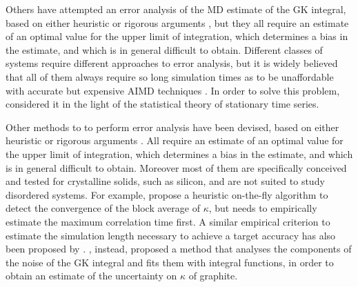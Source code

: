 \begin{LEtext}
Others have attempted an error analysis of the MD estimate of the GK integral, based on either heuristic or rigorous arguments \citep{Jones2012,Wang_gk2017,Oliveira2017}, but they all require an estimate of an optimal value for the upper limit of integration, which determines a bias in the estimate, and which is in general difficult to obtain. 
Different classes of systems require different approaches to error analysis, but it is widely believed that all of them always require so long simulation times as to be unaffordable with accurate but expensive AIMD techniques \citep{Carbogno:2017gc}. In order to solve this problem, \cite{Ercole2017} considered it in the light of the statistical theory of stationary time series.

Other methods to to perform error analysis have been devised, based on either heuristic or rigorous arguments \cite{Howell2012,Chen2010,Jones2012,Wang_gk2017,Oliveira2017}. All require an estimate of an optimal value for the upper limit of integration, which determines a bias in the estimate, and which is in general difficult to obtain. Moreover most of them are specifically conceived and tested for crystalline solids, such as silicon, and are not suited to study disordered systems. 
For example, \citet{Jones2012} propose a heuristic on-the-fly algorithm to detect the convergence of the block average of $\kappa$, but needs to empirically estimate the maximum correlation time first. A similar empirical criterion to estimate the simulation length necessary to achieve a target accuracy has also been proposed by \citet{Wang_gk2017}. \citet{Oliveira2017}, instead, proposed a method that analyses the components of the noise of the GK integral and fits them with integral functions, in order to obtain an estimate of the uncertainty on $\kappa$ of graphite.



\end{LEtext}
